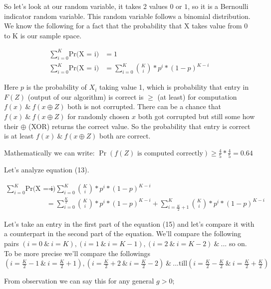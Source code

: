 \documentclass[addpoints,12pt]{exam}
\begin{document}
\begin{questions}
\begin{solution}
            So let's look at our random variable, it takes 2 values $0$ or $1$, so it is a Bernoulli indicator random variable. This random variable follows a binomial distribution. We know the following for a fact that the probability that X takes value from 0 to K is our sample space.

            \begin{align}
                \displaystyle\sum_{i=0} ^{K}\text{Pr(X = i)} &= 1\\
                \displaystyle\sum_{i=0} ^{K}\text{Pr(X = i)} &= \displaystyle\sum_{i=0} ^{K}\binom{K}{i} * p^i * (1 - p)^{K - i}
            \end{align}

            Here $p$ is the probability of $X_i$ taking value 1, which is probability that entry in $F(Z)$ (output of our algorithm) is correct is $\geq$ (at least) for computation $f(x) \:\&\: f(x \oplus Z)$ both is not corrupted. There can be a chance that $f(x) \:\&\: f(x \oplus Z)$ for randomly chosen $x$ both got corrupted but still some how their $\oplus$ (XOR) returns the correct value. So the probability that entry is correct is at least $f(x) \:\&\: f(x \oplus Z)$ both are correct.

            Mathematically we can write: $\Pr(f(Z) \text{ is computed correctly}) \geq \frac{4}{5} * \frac{4}{5} = 0.64$

            Let's analyze equation (13).

            \begin{align}
                \displaystyle\sum_{i=0} ^{K}\text{Pr(X = i)} &= \displaystyle\sum_{i=0} ^{K}\binom{K}{i} * p^i * (1 - p)^{K - i}\\
                &= \displaystyle\sum_{i=0} ^{\frac{K}{2}}\binom{K}{i} * p^i * (1 - p)^{K - i} + \displaystyle\sum_{i=\frac{K}{2} + 1} ^{K}\binom{K}{i} * p^i * (1 - p)^{K - i}
            \end{align}

            Let's take an entry in the first part of the equation (15) and let's compare it with a counterpart in the second part of the equation. We'll compare the following pairs $(i=0 \:\&\: i=K), (i=1 \:\&\: i=K-1), (i=2 \:\&\: i=K-2) \:\&\: ...$ so on. To be more precise we'll compare the followings $(i=\frac{K}{2} - 1 \:\&\: i=\frac{K}{2} + 1), (i=\frac{K}{2} + 2 \:\&\: i=\frac{K}{2} -2) \:\&\: ... \text{till} (i=\frac{K}{2} - \frac{K}{2} \:\&\: i=\frac{K}{2} + \frac{K}{2})$

            From observation we can say this for any general $g > 0$;


\end{solution}
\end{questions}
\end{document}

